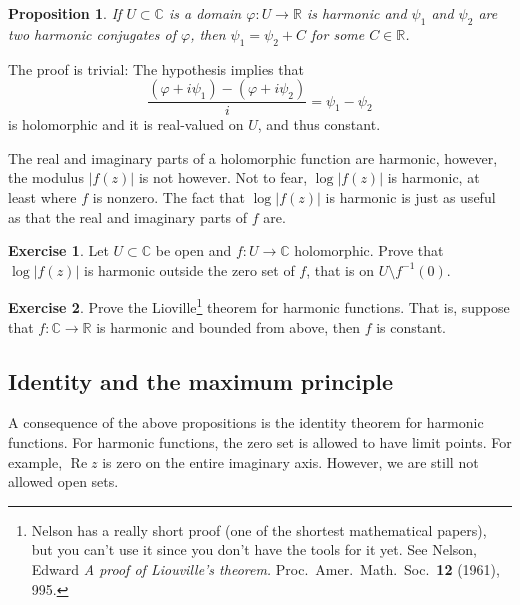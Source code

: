 \documentclass[12pt,openany]{book}
\renewcommand{\Re}{\operatorname{Re}}
\newcommand{\sabs}[1]{\lvert {#1} \rvert}
\newcommand{\C}{{\mathbb{C}}}
\newcommand{\R}{{\mathbb{R}}}
\theoremstyle{plain}
\newtheorem{prop}[thm]{Proposition}
\theoremstyle{remark}
\theoremstyle{definition}
\newenvironment{exbox}{%
    \def\FrameCommand{\vrule width 1pt \relax\hspace{10pt}}%
    \MakeFramed{\advance\hsize-\width\FrameRestore}%
}{%
    \endMakeFramed
}
\theoremstyle{exercise}
\newtheorem{exercise}{Exercise}[section]
\theoremstyle{example}
\begin{document}
\begin{prop}
If $U \subset \C$ is a domain $\varphi \colon U \to \R$ is harmonic
and $\psi_1$ and $\psi_2$ are two harmonic conjugates of $\varphi$,
then $\psi_1 = \psi_2 + C$ for some $C \in \R$.
\end{prop}

The proof is trivial: The hypothesis implies that
\begin{equation*}
\frac{(\varphi + i \psi_1) - (\varphi + i \psi_2)}{i} =  \psi_1-\psi_2
\end{equation*}
is holomorphic and it is real-valued on $U$, and thus constant.

The real and imaginary parts of a holomorphic function are harmonic,
however, the modulus $\sabs{f(z)}$ is not however.  Not to fear,
$\log \sabs{f(z)}$ is harmonic, at least where $f$ is nonzero.
The fact that $\log \sabs{f(z)}$ is harmonic is just as useful
as that the real and imaginary parts of $f$ are.

\begin{savenotes}
\begin{exbox}
\begin{exercise}
Let $U \subset \C$ be open and
$f \colon U \to \C$ holomorphic.  Prove that $\log \sabs{f(z)}$ is harmonic
outside the zero set of $f$, that is on $U \setminus f^{-1}(0)$.
\end{exercise}

\begin{exercise}
Prove the Lioville\footnote{%
Nelson has a really short proof (one of the shortest
mathematical papers), but you can't use it since you don't have the
tools for it yet.  See Nelson, Edward
\emph{A proof of Liouville's theorem.}
Proc.\ Amer.\ Math.\ Soc.\ {\textbf{12}} (1961), 995.} theorem for
harmonic functions.  That is, suppose that $f \colon \C \to \R$ is harmonic
and bounded from above, then $f$ is constant.
\end{exercise}
\end{exbox}
\end{savenotes}



\subsection{Identity and the maximum principle}

A consequence of the above propositions is the identity theorem
for harmonic functions.  For harmonic functions, the zero set is allowed to
have limit points. For example, $\Re z$ is zero on the entire imaginary
axis.  However, we are still not allowed open sets.
\end{document}
